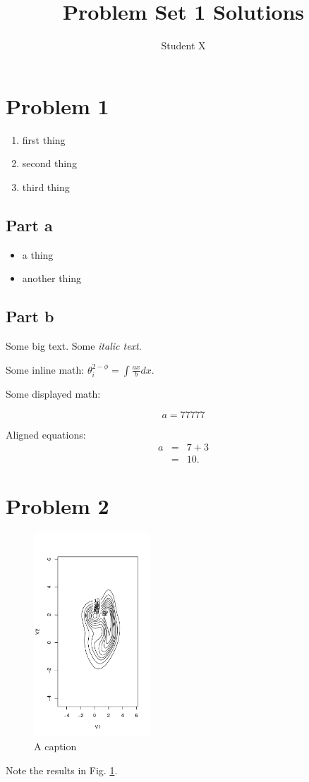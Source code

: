\documentclass[12pt]{article}
\begin{document}
\title{Problem Set 1 Solutions}
\author{Student X}

\maketitle


\section{Problem 1}

\begin{enumerate}
\item first thing
\item second thing
\item third thing
\end{enumerate}

\subsection{Part a}

\begin{itemize}
\item a thing
\item another thing
\end{itemize}

\subsection{Part b}

Some {\large big text}.  Some {\it italic text}. 

Some inline math: $ \theta_{i}^{2-\phi} = \int \frac{ax}{b} dx $.

Some displayed math:

\[
a = 77777
\]

Aligned equations:
\begin{eqnarray*} 
a & = & 7 + 3 \\
  & = & 10.
\end{eqnarray*}

\section{Problem 2}

\begin{figure}
  \includegraphics[height=3in]{kdeFit.pdf}
  \caption{A caption}
  \label{fig:myfig}
\end{figure}

Note the results in Fig. \ref{fig:myfig}.
\end{document}
